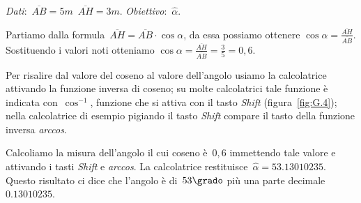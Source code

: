 \emph{Dati}:~$\overline{AB}=5\unit{m}$\quad~$\overline{AH}=3\unit{m}$. 
\qquad\emph{Obiettivo}:~$\hat{\alpha}$.

\begin{soluzione}
 Partiamo dalla formula~$\overline{AH}=\overline{AB}\cdot \cos \alpha$, da 
essa 
possiamo ottenere
$\cos \alpha=\frac{\overline{AH}}{\overline{AB}}$. Sostituendo i valori noti 
otteniamo
$\cos \alpha=\frac{\overline{AH}}{\overline{AB}}=\frac{3}{5}=0,6$.

Per risalire dal valore del coseno al valore dell'angolo usiamo la 
calcolatrice 
attivando la funzione inversa di coseno; su molte calcolatrici
tale funzione è indicata con~$\cos^{-1}$, funzione che si attiva con il tasto 
\emph{Shift} (figura~\ref{fig:G.4}); nella calcolatrice
di esempio pigiando il tasto \emph{Shift} compare il tasto della funzione 
inversa \emph{arccos}.

Calcoliamo la misura dell'angolo il cui coseno è~$0,6$ immettendo tale valore 
e 
attivando i tasti \emph{Shift} e \emph{arccos}.
La calcolatrice restituisce~${\hat{\alpha}}= 53.13010235$.
Questo risultato ci dice che l'angolo è di~$53\grado$ più una parte 
decimale~$0.13010235$.
% 
\end{soluzione}

